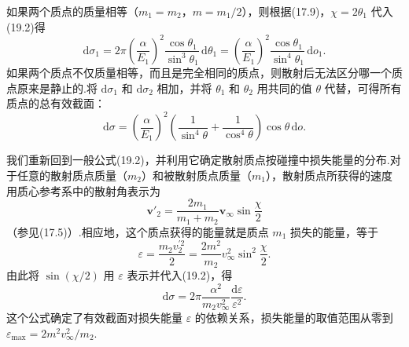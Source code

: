 如果两个质点的质量相等（$m_1=m_2$，$m=m_1/2$），则根据(17.9)，$\chi=2\theta_1$ 代入(19.2)得
\begin{equation}
  \mathrm{d}\sigma_1=2\pi\left(\frac{\alpha}{E_1}\right)^2
  \frac{\cos\theta_1}{\sin^3\theta_1}\,\mathrm{d}\theta_1
  =\left(\frac{\alpha}{E_1}\right)^2
  \frac{\cos\theta_1}{\sin^4\theta_1}\,\mathrm{d}o_1.
\end{equation}
如果两个质点不仅质量相等，而且是完全相同的质点，则散射后无法区分哪一个质点原来是静止的.将 $\mathrm{d}\sigma_1$ 和 $\mathrm{d}\sigma_2$ 相加，并将 $\theta_1$ 和 $\theta_2$ 用共同的值 $\theta$ 代替，可得所有质点的总有效截面：
\begin{equation}
  \mathrm{d}\sigma=\left(\frac{\alpha}{E_1}\right)^2
  \left(\frac{1}{\sin^4\theta}+\frac{1}{\cos^4\theta}\right)
  \cos\theta\,\mathrm{d}o.
\end{equation}

我们重新回到一般公式(19.2)，并利用它确定散射质点按碰撞中损失能量的分布.对于任意的散射质点质量（$m_2$）和被散射质点质量（$m_1$），散射质点所获得的速度用质心参考系中的散射角表示为
\begin{equation*}
  \boldsymbol{v}'_2=\frac{2m_1}{m_1+m_2}\boldsymbol{v}_\infty\sin\frac{\chi}{2}
\end{equation*}
（参见(17.5)）.相应地，这个质点获得的能量就是质点 $m_1$ 损失的能量，等于
\begin{equation*}
  \varepsilon=\frac{m_2v_2^{\prime 2}}{2}
  =\frac{2m^2}{m_2}v_\infty^2\sin^2\frac{\chi}{2}.
\end{equation*}
由此将 $\sin(\chi/2)$ 用 $\varepsilon$ 表示并代入(19.2)，得
\begin{equation}
  \mathrm{d}\sigma=2\pi\frac{\alpha^2}{m_2v_\infty^2}
  \frac{\mathrm{d}\varepsilon}{\varepsilon^2}.
\end{equation}
这个公式确定了有效截面对损失能量 $\varepsilon$ 的依赖关系，损失能量的取值范围从零到 $\varepsilon_\mathrm{max}=2m^2v_\infty^2/m_2$.

